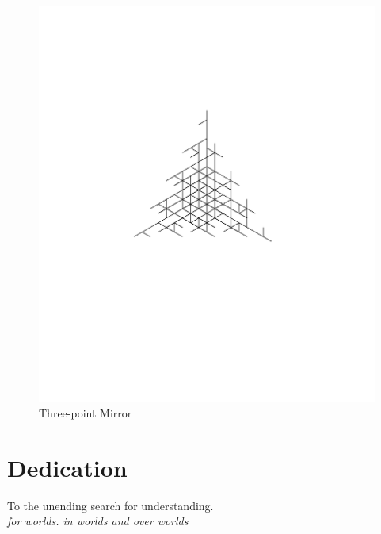 \documentclass[12pt,twoside]{reedthesis}
\begin{document}
	\begin{figure}[h]
	\centering
	\includegraphics[clip=true, viewport=1in 4.5in 9in 9in, scale=0.6]{Images/Abstract1}
	\caption[Three-point Mirror]{Three-point Mirror\protect\footnotemark}
	\label {Acknowledgements1}
	\end{figure}
	
\chapter*{Dedication}
	\begin{center}
	
	To the unending search for understanding.\\
	
	\textit{for worlds. in worlds and over worlds}\\
	
	
	
	\end{center}
	
\end{document}
